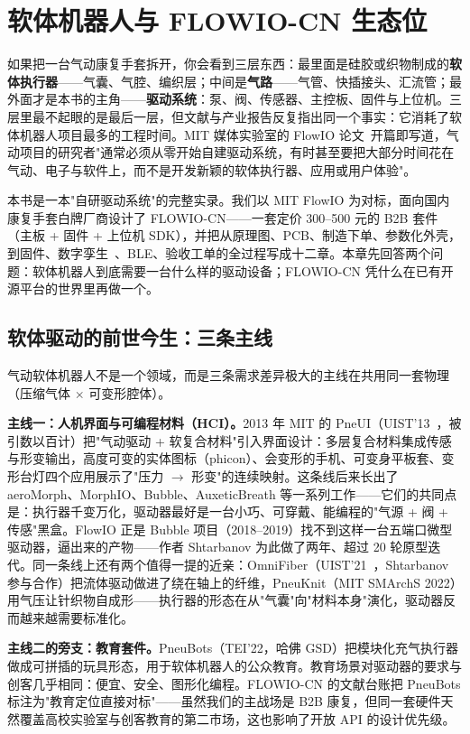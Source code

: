\chapter{软体机器人与 FLOWIO-CN 生态位}
\label{ch:intro}

如果把一台气动康复手套拆开，你会看到三层东西：最里面是硅胶或织物制成的\textbf{软体执行器}——气囊、气腔、编织层；中间是\textbf{气路}——气管、快插接头、汇流管；最外面才是本书的主角——\textbf{驱动系统}：泵、阀、传感器、主控板、固件与上位机。三层里最不起眼的是最后一层，但文献与产业报告反复指出同一个事实：它消耗了软体机器人项目最多的工程时间。MIT 媒体实验室的 FlowIO 论文~\cite{Shtarbanov2021}开篇即写道，气动项目的研究者"通常必须从零开始自建驱动系统，有时甚至要把大部分时间花在气动、电子与软件上，而不是开发新颖的软体执行器、应用或用户体验"。

本书是一本"自研驱动系统"的完整实录。我们以 MIT FlowIO 为对标，面向国内康复手套白牌厂商设计了 FLOWIO-CN——一套定价 300--500 元的 B2B 套件（主板 + 固件 + 上位机 SDK），并把从原理图、PCB、制造下单、参数化外壳，到固件、数字孪生~\cite{Tao2019,Qi2021}、BLE、验收工单的全过程写成十二章。本章先回答两个问题：软体机器人到底需要一台什么样的驱动设备；FLOWIO-CN 凭什么在已有开源平台的世界里再做一个。

\section{软体驱动的前世今生：三条主线}
\label{sec:intro-lines}

气动软体机器人不是一个领域，而是三条需求差异极大的主线在共用同一套物理（压缩气体 $\times$ 可变形腔体）。

\textbf{主线一：人机界面与可编程材料（HCI）。}2013 年 MIT 的 PneUI（UIST'13~\cite{Yao2013}，被引数以百计）把"气动驱动 + 软复合材料"引入界面设计：多层复合材料集成传感与形变输出，高度可变的实体图标（phicon）、会变形的手机、可变身平板套、变形台灯四个应用展示了"压力 $\to$ 形变"的连续映射。这条线后来长出了 aeroMorph、MorphIO、Bubble、AuxeticBreath 等一系列工作——它们的共同点是：执行器千变万化，驱动器最好是一台小巧、可穿戴、能编程的"气源 + 阀 + 传感"黑盒。FlowIO 正是 Bubble 项目（2018--2019）找不到这样一台五端口微型驱动器，逼出来的产物——作者 Shtarbanov 为此做了两年、超过 20 轮原型迭代。同一条线上还有两个值得一提的近亲：OmniFiber（UIST'21~\cite{Afsar2021}，Shtarbanov 参与合作）把流体驱动做进了绕在轴上的纤维，PneuKnit（MIT SMArchS 2022）用气压让针织物自成形——执行器的形态在从"气囊"向"材料本身"演化，驱动器反而越来越需要标准化。

\textbf{主线二的旁支：教育套件。}PneuBots（TEI'22，哈佛 GSD）把模块化充气执行器做成可拼插的玩具形态，用于软体机器人的公众教育。教育场景对驱动器的要求与创客几乎相同：便宜、安全、图形化编程。FLOWIO-CN 的文献台账把 PneuBots 标注为"教育定位直接对标"——虽然我们的主战场是 B2B 康复，但同一套硬件天然覆盖高校实验室与创客教育的第二市场，这也影响了开放 API 的设计优先级。

